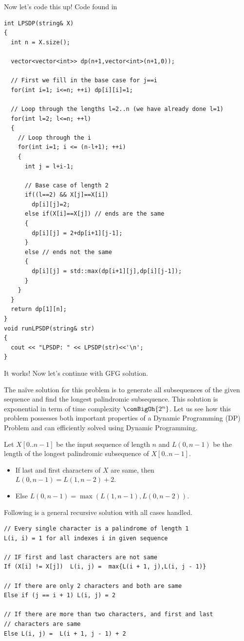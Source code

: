 Now let's code this up! Code found in\\
\begin{lstlisting}[style=raycppnewsnippet]
int LPSDP(string& X)
{
  int n = X.size();

  vector<vector<int>> dp(n+1,vector<int>(n+1,0));

  // First we fill in the base case for j==i
  for(int i=1; i<=n; ++i) dp[i][i]=1;

  // Loop through the lengths l=2..n (we have already done l=1)
  for(int l=2; l<=n; ++l)
  {
    // Loop through the i
    for(int i=1; i <= (n-l+1); ++i)
    {
      int j = l+i-1;

      // Base case of length 2
      if((l==2) && X[j]==X[i])
        dp[i][j]=2;
      else if(X[i]==X[j]) // ends are the same
      {
        dp[i][j] = 2+dp[i+1][j-1];
      }
      else // ends not the same
      {
        dp[i][j] = std::max(dp[i+1][j],dp[i][j-1]);
      }
    }
  }
  return dp[1][n];
}
void runLPSDP(string& str)
{
  cout << "LPSDP: " << LPSDP(str)<<'\n';
}
\end{lstlisting}
It works! Now let's continue with GFG solution.

\RayNotesEnd

\textbf{}

The na\"ive solution for this problem is to generate all subsequences of the
given sequence and find the longest palindromic subsequence. This solution
is exponential in term of time complexity $\comBigOh{2^n}$. Let us see how
this problem possesses both important properties of a Dynamic Programming
(DP) Problem and can efficiently solved using Dynamic Programming.


Let $X[0..n-1]$ be the input sequence of length $n$ and $L(0, n-1)$ be the
length of the longest palindromic subsequence of $X[0..n-1]$.
\begin{itemize}[noitemsep,topsep=0pt]
\item If last and first characters of $X$ are same, then
  $L(0,n-1)=L(1,n-2)+2$.
\item Else $L(0,n-1)=\max( L(1, n-1), L(0, n-2) )$.
\end{itemize}
Following is a general recursive solution with all cases handled.
\begin{lstlisting}[style=raygeneric]
// Every single character is a palindrome of length 1
L(i, i) = 1 for all indexes i in given sequence

// IF first and last characters are not same
If (X[i] != X[j])  L(i, j) =  max{L(i + 1, j),L(i, j - 1)} 

// If there are only 2 characters and both are same
Else if (j == i + 1) L(i, j) = 2  

// If there are more than two characters, and first and last 
// characters are same
Else L(i, j) =  L(i + 1, j - 1) + 2 
\end{lstlisting}


